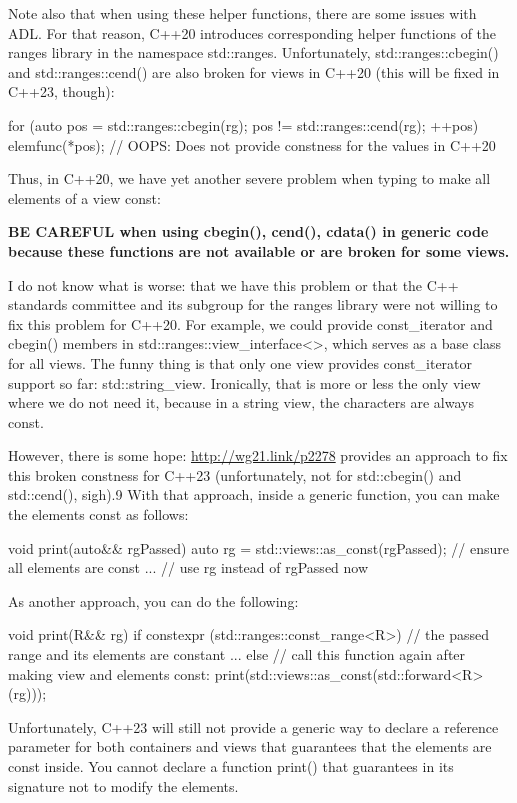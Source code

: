 Note also that when using these helper functions, there are some issues with ADL. For that reason, C++20 introduces corresponding helper functions of the ranges library in the namespace std::ranges. Unfortunately, std::ranges::cbegin() and std::ranges::cend() are also broken for views in C++20 (this will be fixed in C++23, though):

\begin{cpp}
for (auto pos = std::ranges::cbegin(rg); pos != std::ranges::cend(rg); ++pos) {
	elemfunc(*pos); // OOPS: Does not provide constness for the values in C++20
}
\end{cpp}

Thus, in C++20, we have yet another severe problem when typing to make all elements of a view const:

\textbf{BE CAREFUL when using cbegin(), cend(), cdata() in generic code because these functions are not available or are broken for some views.}

I do not know what is worse: that we have this problem or that the C++ standards committee and its subgroup for the ranges library were not willing to fix this problem for C++20. For example, we could provide const\_iterator and cbegin() members in std::ranges::view\_interface<>, which serves as a base class for all views. The funny thing is that only one view provides const\_iterator support so far: std::string\_view. Ironically, that is more or less the only view where we do not need it, because in a string view, the characters are always const.

However, there is some hope: \url{http://wg21.link/p2278} provides an approach to fix this broken constness for C++23 (unfortunately, not for std::cbegin() and std::cend(), sigh).9 With that approach, inside a generic function, you can make the elements const as follows:

\begin{cpp}
void print(auto&& rgPassed)
{
	auto rg = std::views::as_const(rgPassed); // ensure all elements are const
	... // use rg instead of rgPassed now
}
\end{cpp}

As another approach, you can do the following:

\begin{cpp}
void print(R&& rg)
{
	if constexpr (std::ranges::const_range<R>) {
		// the passed range and its elements are constant
		...
	}
	else {
		// call this function again after making view and elements const:
		print(std::views::as_const(std::forward<R>(rg)));
	}
}
\end{cpp}

Unfortunately, C++23 will still not provide a generic way to declare a reference parameter for both containers and views that guarantees that the elements are const inside. You cannot declare a function print() that guarantees in its signature not to modify the elements.

